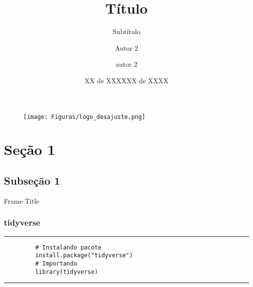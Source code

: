 \documentclass[xcolor=dvipsnames]{beamer}
\title[Título]{Título}
\subtitle{Subtítulo}
\author[Autor 1 \and Autor 2]{Autor 2 \and autor 2}
\date{XX de XXXXXX de XXXX}
\begin{document}
\begin{frame}
    \titlepage
    \begin{figure}[htpb]
            \texttt{[image: Figuras/logo\_desajuste.png]}
    \end{figure}
\end{frame}


\begin{frame}
    \tableofcontents
\end{frame}

\section{Seção 1} %
\begin{frame}
    \tableofcontents[currentsection]
\end{frame}
\subsection{Subseção 1}
\begin{frame}{Frame Title}
    
\end{frame}
\begin{frame}[fragile]
    \frametitle{tidyverse}
    
    \rule{\textwidth}{1pt}
    \scriptsize
    \begin{verbatim}
         # Instalando pacote
         install.package("tidyverse")
         # Importando
         library(tidyverse)
    \end{verbatim}
    \rule{\textwidth}{1pt}
\end{frame}
\end{document}
